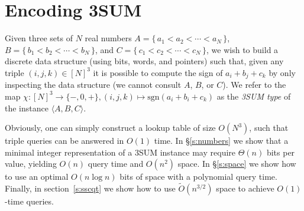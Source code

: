 \chapter{Encoding 3SUM}
\label{paper:3sum-encoding}

Given three sets of \(N\) real numbers
\(A = \{\, a_1 < a_2 < \cdots < a_N\,\} \),
\(B = \{\, b_1 < b_2 < \cdots < b_N\,\} \),
and \(C = \{\, c_1 < c_2 < \cdots < c_N\,\}\),
we wish to build a discrete data structure (using bits, words, and pointers) such that,
given any triple \((i,j,k) \in {[N]}^3\) it is possible to compute the sign of
\(a_i + b_j + c_k\) by only inspecting the data structure (we cannot consult
\(A\), \(B\), or \(C\)).
We refer to the map $\chi : {[N]}^3\to \{-,0,+\}, (i,j,k)\mapsto\mathrm{sgn}
(a_i+b_i+c_k)$ as the {\em 3SUM type} of the instance $\langle A,B,C \rangle$.

Obviously, one can simply construct a lookup table of size \(O(N^3)\), such
that triple queries can be answered in \(O(1)\) time.
%
In \S\ref{s:numbers} we show that a minimal integer representation of a
3SUM instance may require $\Theta(n)$ bits per value, yielding
$O(n)$ query time and $O(n^2)$ space.
%
In \S\ref{s:space} we show how to use an optimal $O(n \log n)$ bits of
space with a polynomial query time. Finally, in section~\ref{s:sscqt} we show
how to use $\tilde{O}(n^{3/2})$ space to achieve $O(1)$-time queries.


